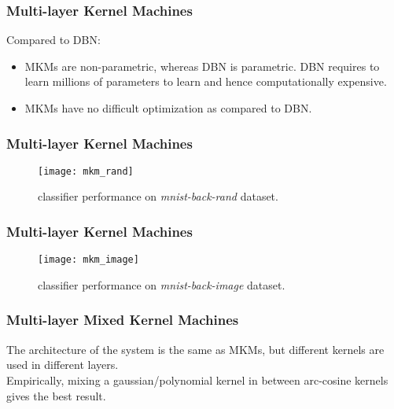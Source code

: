 \documentclass[a4paper,compress,svgnames]{beamer}
\begin{document}
\begin{frame}
\frametitle{Multi-layer Kernel Machines}
Compared to DBN:\\
\vspace{0.2in}
\begin{itemize}
\setlength\itemsep{1em}
\item MKMs are non-parametric, whereas DBN is parametric. DBN requires to learn millions of parameters to learn and hence computationally expensive.
\item MKMs have no difficult optimization as compared to DBN. 
\end{itemize}
\end{frame}

\begin{frame}
\frametitle{Multi-layer Kernel Machines}
\begin{figure}
  \centering
  \captionsetup{justification=centering,margin=0.1cm}
  \texttt{[image: mkm\_rand]}
  \caption{classifier performance on \textit{mnist-back-rand} dataset.}
  \label{mkm_rand}
\end{figure}
\end{frame}

\begin{frame}
\frametitle{Multi-layer Kernel Machines}
\begin{figure}
  \centering
  \captionsetup{justification=centering,margin=0.1cm}
  \texttt{[image: mkm\_image]}
  \caption{classifier performance on \textit{mnist-back-image} dataset.}
  \label{mkm_image}
\end{figure}
\end{frame}

\begin{frame}
\frametitle{Multi-layer Mixed Kernel Machines}
The architecture of the system is the same as MKMs, but different kernels are used in different layers.\\
\vspace{0.3in}
Empirically, mixing a gaussian/polynomial kernel in between arc-cosine kernels gives the best result.
\end{frame}
\end{document}

